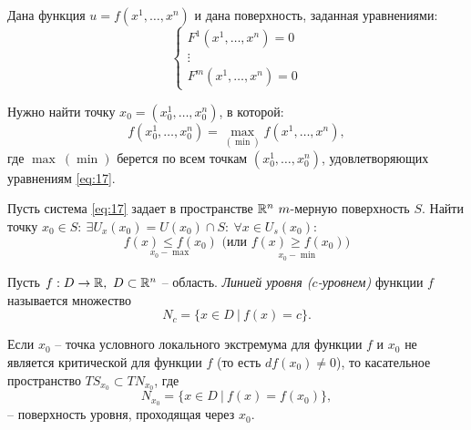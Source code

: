 \begin{task}
    Дана функция $u = f(x^1,\ldots,x^n)$ и дана поверхность, заданная уравнениями:
    \begin{equation}\label{eq:17}
        \left\{\begin{array}{l}
            F^1(x^1,\ldots,x^n) = 0 \\
            \vdots                  \\
            F^m(x^1,\ldots,x^n) = 0
        \end{array}\right.
    \end{equation}

    Нужно найти точку $x_0 = (x_0^1,\ldots,x_0^n)$, в которой:
    \[
        f(x_0^1,\ldots,x_0^n) = \underset{(\min)}{\max}f(x^1,\ldots,x^n),
    \]
    где $\max \ (\min)$ берется по всем точкам $(x_0^1,\ldots,x_0^n)$, удовлетворяющих уравнениям \ref{eq:17}.
\end{task}

\begin{task}

    Пусть система \ref{eq:17} задает в пространстве $\mathbb{R}^n \ m$-мерную поверхность $S$. Найти точку $x_0 \in S: \ \exists U_x(x_0) = U(x_0)\cap S: \ \forall x \in U_s(x_0)$:
    \[
        \underset{x_0 - \max}{f(x) \leqslant f(x_0)}\text{ (или }\underset{x_0 - \min}{f(x) \geqslant f(x_0)}\text{)}
    \]
\end{task}

\begin{definition}
    Пусть $f:D\rightarrow\mathbb{R}, \ D \subset \mathbb{R}^n$ -- область. \emph{Линией уровня ($c$-уровнем)} функции $f$ называется множество
    \[
        N_c = \big\{x\in D \ \big| \ f(x) = c\big\}.
    \]
\end{definition}

\begin{lemma}\label{lemma:1}
    Если $x_0$ -- точка условного локального экстремума для функции $f$ и $x_0$ не является критической для функции $f$ (то есть $df(x_0)\ne0$), то касательное пространство $TS_{x_0}\subset TN_{x_0}$, где
    \[
        N_{x_0} = \big\{x \in D \ \big| \ f(x) = f(x_0)\big\},
    \] -- поверхность уровня, проходящая через $x_0$.
\end{lemma}

